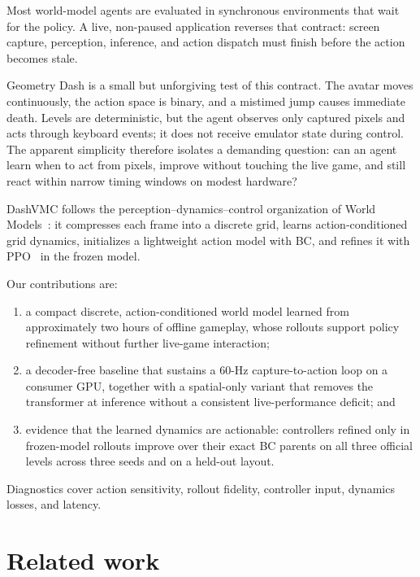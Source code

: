Most world-model agents are evaluated in synchronous environments that wait for the policy.
A live, non-paused application reverses that contract: screen capture, perception, inference, and action dispatch must finish before the action becomes stale.

Geometry Dash is a small but unforgiving test of this contract.
The avatar moves continuously, the action space is binary, and a mistimed jump causes immediate death.
Levels are deterministic, but the agent observes only captured pixels and acts through keyboard events; it does not receive emulator state during control.
The apparent simplicity therefore isolates a demanding question: can an agent learn when to act from pixels, improve without touching the live game, and still react within narrow timing windows on modest hardware?

DashVMC follows the perception--dynamics--control organization of World Models~\citep{ha2018world}: it compresses each frame into a discrete grid, learns action-conditioned grid dynamics, initializes a lightweight action model with BC, and refines it with PPO~\citep{schulman2017ppo} in the frozen model.

Our contributions are:
\begin{enumerate}
  \item a compact discrete, action-conditioned world model learned from approximately two hours of offline gameplay, whose rollouts support policy refinement without further live-game interaction;
  \item a decoder-free baseline that sustains a 60-Hz capture-to-action loop on a consumer GPU, together with a spatial-only variant that removes the transformer at inference without a consistent live-performance deficit; and
  \item evidence that the learned dynamics are actionable: controllers refined only in frozen-model rollouts improve over their exact BC parents on all three official levels across three seeds and on a held-out layout.
\end{enumerate}
Diagnostics cover action sensitivity, rollout fidelity, controller input, dynamics losses, and latency.

\FloatBarrier
\section{Related work}
\label{sec:related}

